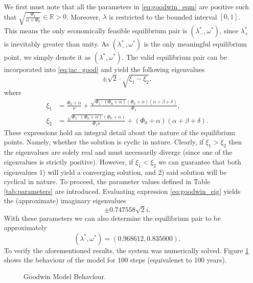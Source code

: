 \documentclass[12pt, centerh1]{article}
\begin{document}
We first must note that all the parameters in \eqref{eq:goodwin_eqm} are positive such that $\sqrt{\frac{\Phi_1}{\alpha + \Phi_0}} \in\mathbb R > 0$. Moreover, $\lambda$ is restricted to the bounded interval $[0, 1]$. This means the only economically feasible equilibrium pair is $(\lambda_-^\ast, \omega^\ast)$, since $\lambda_+^\ast$ is inevitably greater than unity. As $(\lambda_-^\ast, \omega^\ast)$ is the only meaningful equilibrium point, we simply denote it as $(\lambda^\ast, \omega^\ast)$. The valid equilibrium pair can be incorporated into \eqref{eq:jac_good} and yield the following eigenvalues
\begin{equation} \label{eq:goodwin_eig}
    \pm\sqrt 2\cdot\sqrt{\xi_1 - \xi_2},
\end{equation}
where
\begin{equation*}
\begin{split}
    \xi_1 &= \frac{\Phi_0 + \alpha}{\nu} + \frac{\sqrt{\Phi_1\cdot(\Phi_0 + \alpha)}(\Phi_0+\alpha)(\alpha+\beta+\delta)}{\Phi_1},\\
    \xi_2 &= \frac{\sqrt{\Phi_1\cdot(\Phi_0 + \alpha)}(\Phi_0 + \alpha)}{\Phi_1\nu} + (\Phi_0+\alpha)(\alpha+\beta+\delta).
    \end{split}
\end{equation*}
These expressions hold an integral detail about the nature of the equilibrium points. Namely, whether the solution is cyclic in nature. Clearly, if $\xi_1>\xi_2$ then the eigenvalues are solely real and must necessarily diverge (since one of the eigenvalues is strictly positive). However, if $\xi_1<\xi_2$ we can guarantee that both eigenvalues 1) will yield a converging solution, and 2) said solution will be cyclical in nature. To proceed, the parameter values defined in Table \ref{tab:parameters} are introduced. Evaluating expression \eqref{eq:goodwin_eig} yields the (approximate) imaginary eigenvalues
\begin{equation} \label{eq:goodwin_eig_eval}
    \pm\num{0.747558}\sqrt{2}i.
\end{equation}
With these parameters we can also determine the equilibrium pair to be approximately
\begin{equation}
    (\lambda^\ast, \omega^\ast) = (0.968612, 0.835000).
\end{equation}
\noindent
To verify the aforementioned results, the system was numerically solved. Figure \ref{fig:goodwin} shows the behaviour of the model for 100 steps (equivalenet to 100 years). 
\begin{figure}[H]
    \centering
    
    \caption{Goodwin Model Behaviour.}
    \label{fig:goodwin}
\end{figure}
\end{document}
